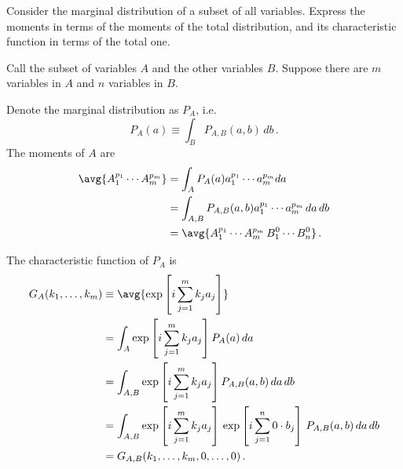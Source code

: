 

Consider the marginal distribution of a subset of all variables.
Express the moments in terms of the moments of the total distribution, and its characteristic function in terms of the total one.


Call the subset of variables $A$ and the other variables $B$.
Suppose there are $m$ variables in $A$ and $n$ variables in $B$.

Denote the marginal distribution as $P_A$, i.e.
\begin{equation*}
P_A(a) \equiv \int_B P_{A,B}(a, b) \, db \, .
\end{equation*}
The moments of $A$ are
\begin{align*}
\avg{A_1^{p_1} \cdots A_m^{p_m}}
&= \int_A P_A(a) a_1^{p_1} \cdots a_m^{p_m} da \\
&= \int_{A,B} P_{A,B}(a, b) a_1^{p_1} \cdots a_m^{p_m} \, da \, db \\
&= \avg{A_1^{p_1} \cdots A_m^{p_m} \, B_1^0 \cdots B_n^0} \, .
\end{align*}

The characteristic function of $P_A$ is
\begin{align*}
G_A(k_1, \ldots ,k_m)
& \equiv \avg{\exp\left[i \sum_{j=1}^m k_j a_j \right]} \\
&= \int_A \exp\left[i \sum_{j=1}^m k_j a_j \right] P_A(a) \, da \\
&= \int_{A,B} \exp\left[i \sum_{j=1}^m k_j a_j \right] P_{A,B}(a, b) \, da \, db \\
&= \int_{A,B}
\exp \left[i \sum_{j=1}^m k_j a_j \right] \,
\exp \left[i \sum_{j=1}^n 0 \cdot b_j \right]
\, P_{A,B}(a, b) \, da \, db \\
&= G_{A,B}(k_1, \ldots, k_m, 0, \ldots, 0) \, .
\end{align*}
